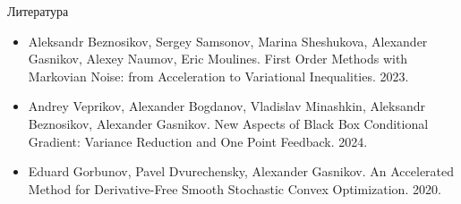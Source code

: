 \documentclass{beamer}
\begin{document}

\begin{frame}{Литература}

\begin{itemize}
 \item Aleksandr Beznosikov, Sergey Samsonov, Marina Sheshukova, Alexander Gasnikov, Alexey Naumov, Eric Moulines. First Order Methods with Markovian Noise: from Acceleration to Variational Inequalities. 2023.
 \item Andrey Veprikov, Alexander Bogdanov, Vladislav Minashkin, Aleksandr Beznosikov, Alexander Gasnikov. New Aspects of Black Box Conditional Gradient: Variance Reduction and One Point Feedback. 2024.
 \item Eduard Gorbunov, Pavel Dvurechensky, Alexander Gasnikov. An Accelerated Method for Derivative-Free Smooth Stochastic Convex Optimization. 2020.
\end{itemize}

\end{frame}


%
%


%
\end{document}
